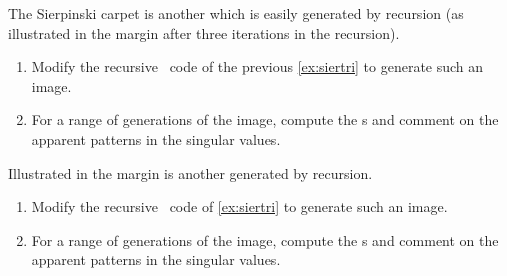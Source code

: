 \begin{exercise} \label{ex:} 
The Sierpinski carpet is another  which is easily generated by recursion (as illustrated in the margin after three iterations in the recursion).
\marginpar{}
\begin{enumerate}
\item Modify the recursive \script\ code of the previous \autoref{ex:siertri} to generate such an image.

\item For a range of generations of the image, compute the s and comment on the apparent patterns in the singular values.
\end{enumerate}
\end{exercise}


\begin{exercise} \label{ex:} 
Illustrated in the margin is another  generated by recursion.
\marginpar{}
\begin{enumerate}
\item Modify the recursive \script\ code of \autoref{ex:siertri} to generate such an image.

\item For a range of generations of the image, compute the s and comment on the apparent patterns in the singular values.
\end{enumerate}
\end{exercise}





